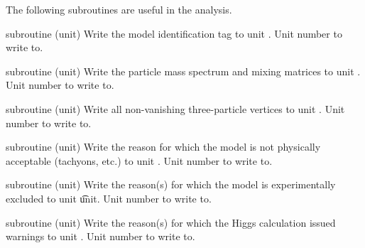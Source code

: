 The following subroutines are useful in the analysis.

\begin{sub}{subroutine (unit)}
   Write the model identification tag to unit .
   Unit number to write to.
\end{sub}

\begin{sub}{subroutine (unit)}
   Write the particle mass spectrum and mixing matrices
  to unit .
   Unit number to write to.
\end{sub}

\begin{sub}{subroutine (unit)}
   Write all non-vanishing three-particle vertices to
  unit .
   Unit number to write to.
\end{sub}

\begin{sub}{subroutine (unit)}
   Write the reason for which the model is not
  physically acceptable (tachyons, etc.) to unit .
   Unit number to write to.
\end{sub}

\begin{sub}{subroutine (unit)}
   Write the reason(s) for which the model is
  experimentally excluded  to unit \t{unit}.
   Unit number to write to.
\end{sub}  

\begin{sub}{subroutine (unit)}
   Write the reason(s) for which the Higgs
  calculation issued warnings to unit .
   Unit number to write to.
\end{sub}  


